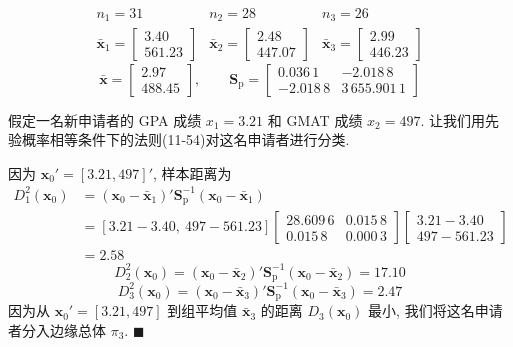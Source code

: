 
\begin{mvfigure}
\label{fig:11.9}
\end{mvfigure}

\[
\begin{array}{ccc}
n_1=31 & n_2=28 & n_3=26\\[6pt]
\bar{\mathbf{x}}_1=\begin{bmatrix}3.40\\561.23\end{bmatrix} &
\bar{\mathbf{x}}_2=\begin{bmatrix}2.48\\447.07\end{bmatrix} &
\bar{\mathbf{x}}_3=\begin{bmatrix}2.99\\446.23\end{bmatrix}
\end{array}
\]
\[
\bar{\mathbf{x}}=\begin{bmatrix}2.97\\488.45\end{bmatrix},\qquad
\mathbf{S}_{\mathrm{p}}=\begin{bmatrix}0.036\,1&-2.018\,8\\-2.018\,8&3\,655.901\,1\end{bmatrix}
\]

假定一名新申请者的 GPA 成绩 $x_1=3.21$ 和 GMAT 成绩 $x_2=497$. 让我们用先验概率相等条件下的法则(11-54)对这名申请者进行分类.

因为 $\mathbf{x}_0'=[3.21,497]'$, 样本距离为
\[
\begin{aligned}
D_1^2(\mathbf{x}_0)&=(\mathbf{x}_0-\bar{\mathbf{x}}_1)'\mathbf{S}_{\mathrm{p}}^{-1}(\mathbf{x}_0-\bar{\mathbf{x}}_1)\\
&=[3.21-3.40,\ 497-561.23]\begin{bmatrix}28.609\,6&0.015\,8\\0.015\,8&0.000\,3\end{bmatrix}\begin{bmatrix}3.21-3.40\\497-561.23\end{bmatrix}\\
&=2.58
\end{aligned}
\]
\[
D_2^2(\mathbf{x}_0)=(\mathbf{x}_0-\bar{\mathbf{x}}_2)'\mathbf{S}_{\mathrm{p}}^{-1}(\mathbf{x}_0-\bar{\mathbf{x}}_2)=17.10
\]
\[
D_3^2(\mathbf{x}_0)=(\mathbf{x}_0-\bar{\mathbf{x}}_3)'\mathbf{S}_{\mathrm{p}}^{-1}(\mathbf{x}_0-\bar{\mathbf{x}}_3)=2.47
\]
因为从 $\mathbf{x}_0'=[3.21,497]$ 到组平均值 $\bar{\mathbf{x}}_3$ 的距离 $D_3(\mathbf{x}_0)$ 最小, 我们将这名申请者分入边缘总体 $\pi_3$. \hfill$\blacksquare$

